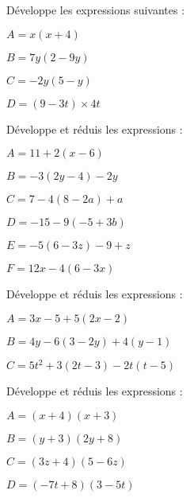 \begin{exercice}[]
Développe les expressions suivantes :
\begin{colenumerate}{2}
\item $A = x(x + 4)$
\item $B = 7y(2 - 9y)$
\item $C = -2y(5 -y)$
\item $D = (9 -3t) \times 4t$
\end{colenumerate}
\end{exercice}

\begin{exercice}[]
Développe et réduis les expressions :
\begin{colenumerate}{2}
\item $A = 11 + 2(x -6)$
\item $B = -3(2y -4) -2y$
\item $C = 7 -4(8 -2a) + a$
\item $D = -15 -9(-5 + 3b)$
\item $E = -5(6 -3z) -9 + z$
\item $F = 12x -4(6 -3x)$
\end{colenumerate}
\end{exercice}

\begin{exercice}[]
Développe et réduis les expressions :
\begin{colenumerate}{1}
\item $A = 3x -5 + 5(2x -2)$
\item $B = 4y -6(3 -2y) + 4(y -1)$
\item $C = 5t^2 + 3(2t -3) -2t(t -5)$
\end{colenumerate}
\end{exercice}








\begin{exercice}[]
Développe et réduis les expressions :
\begin{colenumerate}{2}
\item $A = (x + 4)(x + 3)$
\item $B = (y + 3)(2y + 8)$
\item $C = (3z + 4)(5 -6z)$
\item $D = (-7t + 8)(3 -5t)$
\end{colenumerate}
\end{exercice}

